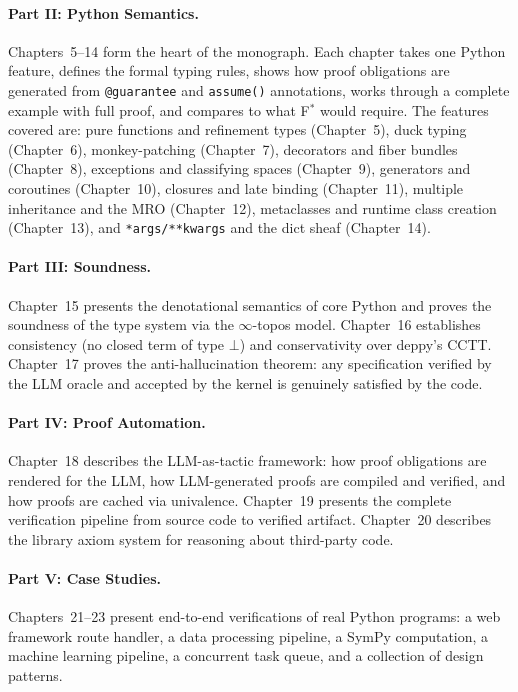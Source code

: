 \documentclass[11pt,a4paper]{report}
\theoremstyle{definition}
\theoremstyle{plain}
\newcommand{\fstar}{F$^{*}$}
\begin{document}
\paragraph{Part II: Python Semantics.}
Chapters~5--14 form the heart of the monograph.  Each chapter takes one
Python feature, defines the formal typing rules, shows how proof obligations
are generated from \lstinline[style=synhopy]{@guarantee} and
\lstinline[style=synhopy]{assume()} annotations, works through a complete
example with full proof, and compares to what \fstar{} would require.
The features covered are: pure functions and refinement types (Chapter~5),
duck typing (Chapter~6), monkey-patching (Chapter~7), decorators and fiber
bundles (Chapter~8), exceptions and classifying spaces (Chapter~9),
generators and coroutines (Chapter~10), closures and late binding
(Chapter~11), multiple inheritance and the MRO (Chapter~12), metaclasses
and runtime class creation (Chapter~13), and \texttt{*args/**kwargs} and
the dict sheaf (Chapter~14).

\paragraph{Part III: Soundness.}
Chapter~15 presents the denotational semantics of core Python and proves
the soundness of the type system via the $\infty$-topos model.  Chapter~16
establishes consistency (no closed term of type $\bot$) and conservativity
over deppy's CCTT.  Chapter~17 proves the anti-hallucination theorem: any
specification verified by the LLM oracle and accepted by the kernel is
genuinely satisfied by the code.

\paragraph{Part IV: Proof Automation.}
Chapter~18 describes the LLM-as-tactic framework: how proof obligations
are rendered for the LLM, how LLM-generated proofs are compiled and
verified, and how proofs are cached via univalence.  Chapter~19 presents
the complete verification pipeline from source code to verified artifact.
Chapter~20 describes the library axiom system for reasoning about
third-party code.

\paragraph{Part V: Case Studies.}
Chapters~21--23 present end-to-end verifications of real Python programs:
a web framework route handler, a data processing pipeline, a SymPy
computation, a machine learning pipeline, a concurrent task queue, and
a collection of design patterns.
\end{document}
